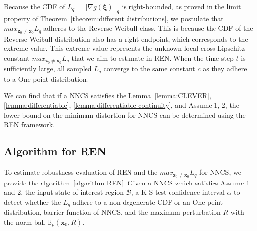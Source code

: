 \documentclass[conference]{IEEEtran}
\newcommand{\ren}{\textsc{REN}\xspace}
\newcommand{\nncs}{\textsc{NNCS}\xspace}
\newcommand{\myvec}[1]{\boldsymbol{#1}}
\newcommand{\calA}{\mathcal{A}}
\newcommand{\calB}{\mathcal{B}}
\newcommand{\bbB}{\mathbb{B}}
\begin{document}
Because the CDF of $L_{q} = ||\nabla g(\myvec{\xi})||_{q}$ 
is right-bounded, 
as proved in the limit property of 
Theorem~\ref{theorem:different distributions}, 
we postulate that $max_{\myvec{z}_{0}\neq\myvec{x}_{0}}L_{q}$ adheres 
to the Reverse Weibull class. This is because the CDF 
of the Reverse Weibull distribution also has 
a right endpoint, which corresponds to the extreme 
value. This extreme value represents the unknown local 
cross Lipschitz constant $max_{\myvec{z}_{0}\neq\myvec{x}_{0}}L_{q}$ 
that we aim to estimate in \ren.
When the time 
step $t$ is sufficiently large, all sampled $L_{q}$ 
converge to the same constant $c$ as they adhere to a 
One-point distribution. 

We can find that if a \nncs satisfies the Lemma~\ref{lemma:CLEVER}, 
\ref{lemma:differentiable}, \ref{lemma:differentiable continuity}, 
and Assume 1, 2, the lower bound on the minimum distortion for 
\nncs can be determined using the \ren framework. 
\subsection{Algorithm for \ren}\label{algorithm}

To estimate robustness evaluation of \ren and 
the $max_{\myvec{z}_{0}\neq \myvec{x}_{0}}L_{q}$ 
for \nncs, 
we provide the algorithm~\ref{algorithm REN}. 
Given a \nncs which satisfies Assume 1 and 2, 
the input state of interest region $\calB$, 
a K-S test confidence interval $\alpha$ to 
detect whether 
the $L_{q}$ adhere to a non-degenerate 
CDF or an One-point 
distribution, 
barrier function of \nncs, 
and the maximum 
perturbation $R$ with the norm 
ball $\bbB_{p}(\myvec{x}_{0},R)$. 
\end{document}
